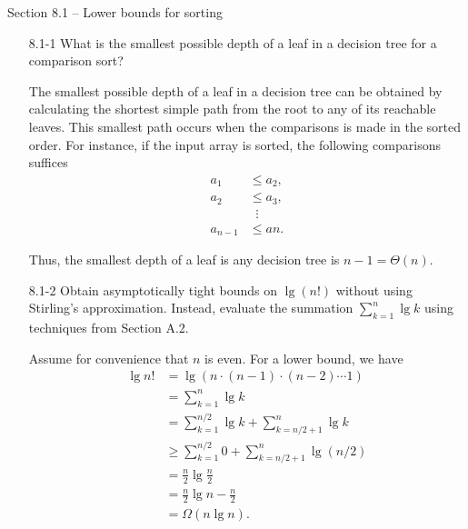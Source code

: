 \documentclass{report}
\makeatletter
\renewenvironment{framed}{%
 \def\FrameCommand##1{\hskip\@totalleftmargin
 \fboxsep=\FrameSep\fbox{##1}}%
 \MakeFramed {\advance\hsize-\width
   \@totalleftmargin\z@ \linewidth\hsize
   \@setminipage}}%
 {\par\unskip\endMakeFramed}
\makeatother
\begin{document}
\small

{\large Section 8.1 {--} Lower bounds for sorting}

\begin{enumerate}

\item[8.1{-}1]{What is the smallest possible depth of a leaf in a decision tree
for a comparison sort?}

\begin{framed}
The smallest possible depth of a leaf in a decision tree
can be obtained by calculating the shortest simple path from the root to any
of its reachable leaves. This smallest path occurs when the comparisons is made
in the sorted order. For instance, if the input array is sorted, the following
comparisons suffices
\begin{equation*}
\begin{aligned}
  a_1 &\le a_2,\\
  a_2 &\le a_3,\\
  &\;\;\vdots\\
  a_{n - 1} &\le a{n}.
\end{aligned}
\end{equation*}

Thus, the smallest depth of a leaf is any decision tree is $n - 1 = \Theta(n)$.

\end{framed}

\item[8.1{-}2]{Obtain asymptotically tight bounds on $\lg(n!)$ without using
Stirling's approximation. Instead, evaluate the summation $\sum_{k = 1}^n \lg k$
using techniques from Section A.2.}

\begin{framed}
Assume for convenience that $n$ is even. For a lower bound, we have
\begin{equation*}
\begin{aligned}
  \lg{n!} &=   \lg(n \cdot (n - 1) \cdot (n - 2) \cdots 1)\\
          &=   \sum_{k = 1}^{n} \lg k\\
          &=   \sum_{k = 1}^{n/2} \lg k + \sum_{k = n/2 + 1}^{n} \lg k\\
          &\ge \sum_{k = 1}^{n/2} 0 + \sum_{k = n/2 + 1}^{n} \lg (n/2)\\
          &=   \frac{n}{2} \lg{\frac{n}{2}}\\
          &=   \frac{n}{2} \lg n - \frac{n}{2}\\
          &=   \Omega(n \lg n).
\end{aligned}
\end{equation*}


\end{framed}
\end{enumerate}
\end{document}
